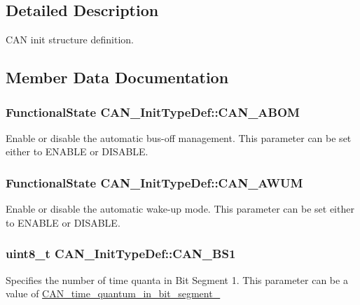 \subsection{Detailed Description}
C\+A\+N init structure definition. 

\subsection{Member Data Documentation}
\hypertarget{struct_c_a_n___init_type_def_a70560646c27d96ca8adc4a62d24dafd9}{}
\subsubsection[{C\+A\+N\+\_\+\+A\+B\+O\+M}]{\setlength{\rightskip}{0pt plus 5cm}Functional\+State C\+A\+N\+\_\+\+Init\+Type\+Def\+::\+C\+A\+N\+\_\+\+A\+B\+O\+M}\label{struct_c_a_n___init_type_def_a70560646c27d96ca8adc4a62d24dafd9}
Enable or disable the automatic bus-\/off management. This parameter can be set either to E\+N\+A\+B\+L\+E or D\+I\+S\+A\+B\+L\+E. \hypertarget{struct_c_a_n___init_type_def_a10f873c858a7b0efc2d0ab41524320d3}{}
\subsubsection[{C\+A\+N\+\_\+\+A\+W\+U\+M}]{\setlength{\rightskip}{0pt plus 5cm}Functional\+State C\+A\+N\+\_\+\+Init\+Type\+Def\+::\+C\+A\+N\+\_\+\+A\+W\+U\+M}\label{struct_c_a_n___init_type_def_a10f873c858a7b0efc2d0ab41524320d3}
Enable or disable the automatic wake-\/up mode. This parameter can be set either to E\+N\+A\+B\+L\+E or D\+I\+S\+A\+B\+L\+E. \hypertarget{struct_c_a_n___init_type_def_aecbd21b55dc88c3a18db93af2836cd58}{}
\subsubsection[{C\+A\+N\+\_\+\+B\+S1}]{\setlength{\rightskip}{0pt plus 5cm}uint8\+\_\+t C\+A\+N\+\_\+\+Init\+Type\+Def\+::\+C\+A\+N\+\_\+\+B\+S1}\label{struct_c_a_n___init_type_def_aecbd21b55dc88c3a18db93af2836cd58}
Specifies the number of time quanta in Bit Segment 1. This parameter can be a value of \hyperlink{group___c_a_n__time__quantum__in__bit__segment__1}{C\+A\+N\+\_\+time\+\_\+quantum\+\_\+in\+\_\+bit\+\_\+segment\+\_} \hypertarget{struct_c_a_n___init_type_def_a693eb00830d6e2aeb4d9fabdba85b9cf}{}

